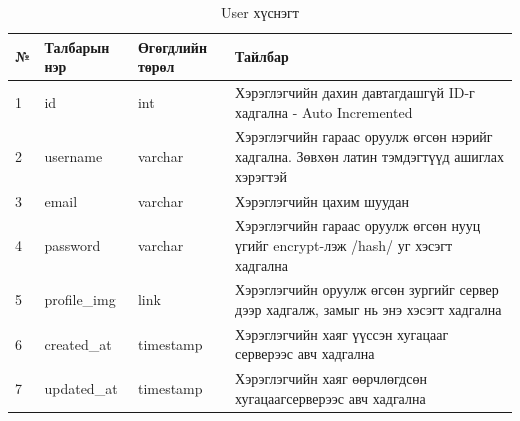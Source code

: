 \begin{table}[h]
	\caption{User хүснэгт}
	\begin{tabular}{|l|l|l|p{8cm}|}
		\hline
		№ & Талбарын нэр & Өгөгдлийн төрөл & Тайлбар                                                                                    \\ \hline
		1 & id           & int             & Хэрэглэгчийн дахин давтагдашгүй ID-г хадгална - Auto Incremented                           \\ \hline
		2 & username     & varchar         & Хэрэглэгчийн гараас оруулж өгсөн нэрийг хадгална. Зөвхөн латин тэмдэгтүүд ашиглах хэрэгтэй \\ \hline
		3 & email        & varchar         & Хэрэглэгчийн цахим шуудан                                                                  \\ \hline
		4 & password     & varchar         & Хэрэглэгчийн гараас оруулж өгсөн нууц үгийг encrypt-лэж /hash/ уг хэсэгт хадгална          \\ \hline
		5 & profile\_img & link            & Хэрэглэгчийн оруулж өгсөн зургийг сервер дээр хадгалж, замыг нь энэ хэсэгт хадгална        \\ \hline
		6 & created\_at  & timestamp       & Хэрэглэгчийн хаяг үүссэн хугацааг серверээс авч хадгална                                   \\ \hline
		7 & updated\_at  & timestamp       & Хэрэглэгчийн хаяг өөрчлөгдсөн хугацаагсерверээс авч хадгална                               \\ \hline
	\end{tabular}
\end{table}

